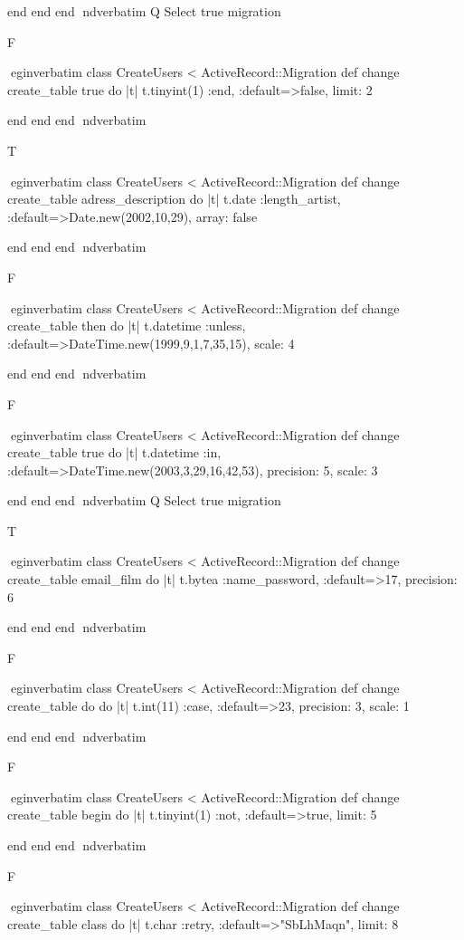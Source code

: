     end 
  end 
end
nd{verbatim}
Q
 Select true migration

F

egin{verbatim}
 class CreateUsers < ActiveRecord::Migration 
  def change 
    create_table true do |t| 
      t.tinyint(1) :end, :default=>false, limit: 2
    
    end 
  end 
end
nd{verbatim}

T

egin{verbatim}
 class CreateUsers < ActiveRecord::Migration 
  def change 
    create_table adress_description do |t| 
      t.date :length_artist, :default=>Date.new(2002,10,29), array: false
    
    end 
  end 
end
nd{verbatim}

F

egin{verbatim}
 class CreateUsers < ActiveRecord::Migration 
  def change 
    create_table then do |t| 
      t.datetime :unless, :default=>DateTime.new(1999,9,1,7,35,15), scale: 4
    
    end 
  end 
end
nd{verbatim}

F

egin{verbatim}
 class CreateUsers < ActiveRecord::Migration 
  def change 
    create_table true do |t| 
      t.datetime :in, :default=>DateTime.new(2003,3,29,16,42,53), precision: 5, scale: 3
    
    end 
  end 
end
nd{verbatim}
Q
 Select true migration

T

egin{verbatim}
 class CreateUsers < ActiveRecord::Migration 
  def change 
    create_table email_film do |t| 
      t.bytea :name_password, :default=>17, precision: 6
    
    end 
  end 
end
nd{verbatim}

F

egin{verbatim}
 class CreateUsers < ActiveRecord::Migration 
  def change 
    create_table do do |t| 
      t.int(11) :case, :default=>23, precision: 3, scale: 1
    
    end 
  end 
end
nd{verbatim}

F

egin{verbatim}
 class CreateUsers < ActiveRecord::Migration 
  def change 
    create_table begin do |t| 
      t.tinyint(1) :not, :default=>true, limit: 5
    
    end 
  end 
end
nd{verbatim}

F

egin{verbatim}
 class CreateUsers < ActiveRecord::Migration 
  def change 
    create_table class do |t| 
      t.char :retry, :default=>"SbLhMaqn", limit: 8
    

